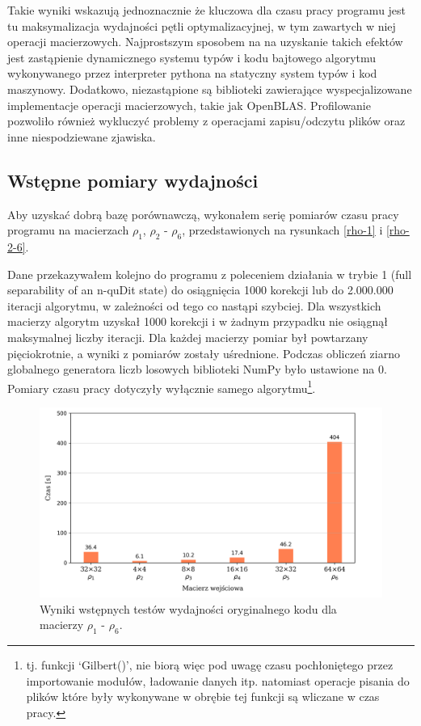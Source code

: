 \documentclass[11pt, a4paper]{article}
\begin{document}
\begin{sloppypar}
    Takie wyniki wskazują jednoznacznie że kluczowa dla czasu pracy programu jest tu maksymalizacja
    wydajności pętli optymalizacyjnej, w tym zawartych w niej operacji macierzowych. Najprostszym
    sposobem na na uzyskanie takich efektów jest zastąpienie dynamicznego systemu typów i
    kodu bajtowego algorytmu wykonywanego przez interpreter pythona na statyczny system typów
    i kod maszynowy. Dodatkowo, niezastąpione są biblioteki zawierające wyspecjalizowane
    implementacje operacji macierzowych, takie jak OpenBLAS. Profilowanie pozwoliło również
    wykluczyć problemy z operacjami zapisu/odczytu plików oraz inne niespodziewane zjawiska.

    \subsection{Wstępne pomiary wydajności}
    Aby uzyskać dobrą bazę porównawczą, wykonałem serię pomiarów czasu pracy programu na
    macierzach $\rho_{1}$, $\rho_{2}$ - $\rho_{6}$, przedstawionych na rysunkach
    \ref{rho-1} i \ref{rho-2-6}.

    Dane przekazywałem kolejno do programu z poleceniem działania w trybie 1 (full separability
    of an n-quDit state) do osiągnięcia 1000 korekcji lub do 2.000.000 iteracji algorytmu,
    w zależności od tego co nastąpi szybciej. Dla wszystkich macierzy algorytm uzyskał 1000
    korekcji i w żadnym przypadku nie osiągnął maksymalnej liczby iteracji. Dla każdej
    macierzy pomiar był powtarzany pięciokrotnie, a wyniki z pomiarów zostały uśrednione.
    Podczas obliczeń ziarno globalnego generatora liczb losowych biblioteki NumPy było
    ustawione na 0. Pomiary czasu pracy dotyczyły wyłącznie samego algorytmu\footnote{tj.
    funkcji `Gilbert()', nie biorą więc pod uwagę czasu pochłoniętego przez importowanie
    modułów, ładowanie danych itp. natomiast operacje pisania do plików które były wykonywane
    w obrębie tej funkcji są wliczane w czas pracy.}.

    \FloatBarrier
    \begin{figure}[ht]
      \centering
      \includegraphics[width=1.0\textwidth]{"resources/original_performance_tests.png"}
      \caption{Wyniki wstępnych testów wydajności oryginalnego kodu dla macierzy $\rho_{1}$ - $\rho
      _{6}$.}
      \label{pre-perf}
    \end{figure}
    \FloatBarrier


\end{sloppypar}
\end{document}
